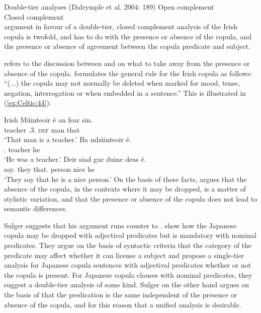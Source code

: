 \documentclass[output=paper,colorlinks,citecolor=brown]{langscibook}
\begin{document}
\ea\label{ex:Celtic:43} Double-tier analyses (Dalrymple et al. 2004: 189)
\ea Open complement\\[1ex]
{}
\ex Closed complement\\[1ex]
{}
\z\z
{} argument in favour of a double-tier, closed complement analysis of the Irish copula is twofold, and has to do with the presence or absence of the copula, and the presence or absence of agreement between the copula predicate and subject.

\citet[570]{Sulger09} refers to the discussion between \citet{dalrympleetal04copular} and \citet{attia08} on what to take away from the presence or absence of the copula. \citet[244]{OSiadhail1989} formulates the general rule for the Irish copula as follows: ``(...) the copula may not normally be deleted when marked for mood, tense, negation, interrogation or when embedded in a sentence.'' This is illustrated in (\ref{ex:Celtic:44}):

\ea\label{ex:Celtic:44} Irish \citep[244]{OSiadhail1989}
\ea
\gll Múinteoir  \'e  an fear sin.\\
teacher  \AGR.{3\SG.\M} \textsc{def} man that\\
\glt`That man is a teacher.'
\ex
\gll Ba  mhúinteoir \'e.\\
\COP.{\PST} teacher he\\
\glt`He was a teacher.'
\ex
\gll Deir siad gur  duine  deas \'e.\\
say.{\PRS}  they that.{\COP} person nice he\\
\glt`They say that he is a nice person.'
\z\z
On the basis of these facts, \citet[570]{Sulger09} argues that the absence of the copula, in the contexts where it may be dropped, is a matter of stylistic variation, and that the presence or absence of the copula does not lead to semantic differences.

Sulger suggests that his argument runs counter to \citet{dalrympleetal04copular}. \citet[190--191]{dalrympleetal04copular} show how the Japanese copula may be dropped with adjectival predicates but is mandatory with nominal predicates. They argue on the basis of syntactic criteria that the category of the predicate may affect whether it can license a subject and propose a single-tier analysis for Japanese copula sentences with adjectival predicates whether or not the copula is present. For Japanese copula clauses with nominal predicates, they suggest a double-tier analysis of some kind. Sulger on the other hand argues on the basis of \citet{attia08} that the predication is the same independent of the presence or absence of the copula, and for this reason that a unified analysis is desirable.
\end{document}

